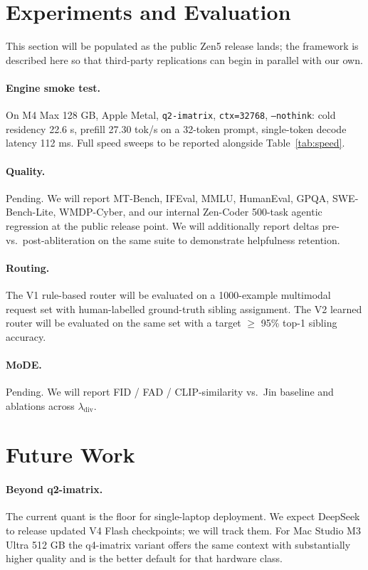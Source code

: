 \documentclass[11pt,a4paper]{article}
\begin{document}
\section{Experiments and Evaluation}
\label{sec:experiments}

This section will be populated as the public Zen5 release lands; the framework is described here so
that third-party replications can begin in parallel with our own.

\paragraph{Engine smoke test.} On M4 Max 128 GB, Apple Metal, \texttt{q2-imatrix},
\texttt{ctx=32768}, \texttt{--nothink}: cold residency 22.6 s, prefill 27.30 tok/s on a 32-token
prompt, single-token decode latency 112 ms. Full speed sweeps to be reported alongside Table~\ref{tab:speed}.

\paragraph{Quality.} Pending. We will report MT-Bench, IFEval, MMLU, HumanEval, GPQA, SWE-Bench-Lite,
WMDP-Cyber, and our internal Zen-Coder 500-task agentic regression at the public release point. We
will additionally report deltas pre- vs.\ post-abliteration on the same suite to demonstrate
helpfulness retention.

\paragraph{Routing.} The V1 rule-based router will be evaluated on a 1000-example multimodal request
set with human-labelled ground-truth sibling assignment. The V2 learned router will be evaluated on
the same set with a target $\geq$ 95\% top-1 sibling accuracy.

\paragraph{MoDE.} Pending. We will report FID / FAD / CLIP-similarity vs.\ Jin baseline and ablations
across $\lambda_\text{div}$.

\section{Future Work}
\label{sec:future}

\paragraph{Beyond q2-imatrix.} The current quant is the floor for single-laptop deployment. We expect
DeepSeek to release updated V4 Flash checkpoints; we will track them. For Mac Studio M3 Ultra 512 GB
the q4-imatrix variant offers the same context with substantially higher quality and is the better
default for that hardware class.
\end{document}
